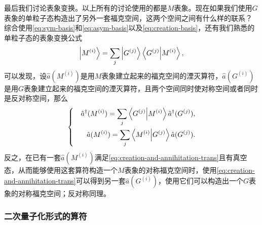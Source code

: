 \documentclass[hyperref, UTF8, a4paper]{ctexart}
\newenvironment{bigcase}{\left\{\quad\begin{aligned}}{\end{aligned}\right.}
\begin{document}
最后我们讨论表象变换。以上所有的讨论使用的都是$M$表象。现在如果我们使用$G$表象的单粒子态构造出了另外一套福克空间，这两个空间之间有什么样的联系？
综合使用\eqref{eq:sym-basis}和\eqref{eq:asym-basis}以及\eqref{eq:creation-basis}，还有我们熟悉的单粒子态的表象变换公式
\[
    \ket{M^{(i)}} = \sum_j \ket{G^{(j)}} \braket{G^{(j)}}{M^{(i)}},
\]
可以发现，设$\hat{a}(M^{(i)})$是用$M$表象建立起来的福克空间的湮灭算符，$\hat{a}(G^{(i)})$是用$G$表象建立起来的福克空间的湮灭算符，且两个空间同时使对称空间或者同时是反对称空间，那么
\begin{equation}
    \begin{bigcase}
        \hat{a}^\dagger (M^{(i)}) = \sum_j \braket{G^{(j)}}{M^{(i)}} \hat{a}^\dagger (G^{(j)}), \\
        \hat{a} (M^{(i)}) = \sum_j \braket{M^{(i)}}{G^{(j)}} \hat{a} (G^{(j)}).
    \end{bigcase}
    \label{eq:creation-and-annihitation-trans}
\end{equation}
反之，在已有一套$\hat{a}(M^{(i)})$满足\eqref{eq:creation-and-annihitation-trans}且有真空态，从而能够使用这套算符构造一个$M$表象的对称福克空间时，使用\eqref{eq:creation-and-annihitation-trans}可以得到另一套$\hat{a}(G^{(i)})$，使用它们可以构造出一个$G$表象的对称福克空间；反对称同理。

\subsubsection{二次量子化形式的算符}
\end{document}
